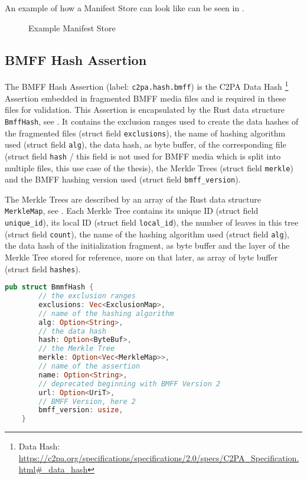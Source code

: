 An example of how a Manifest Store can look like can be seen in .

\begin{figure}[H]
    \caption{Example Manifest Store}
    \label{fig:manifest_store}
\end{figure}

\subsection{BMFF Hash Assertion\label{sec:bmff_assertion}}

The BMFF Hash Assertion (label: \texttt{c2pa.hash.bmff}) is the C2PA Data Hash \footnote{Data Hash: \url{https://c2pa.org/specifications/specifications/2.0/specs/C2PA_Specification.html\#_data_hash}} Assertion embedded in fragmented BMFF media files and is required in these files for validation. This Assertion is encapsulated by the Rust data structure \texttt{BmffHash}, see . It contains the exclusion ranges used to create the data hashes of the fragmented files (struct field \texttt{exclusions}), the name of hashing algorithm used (struct field \texttt{alg}), the data hash, as byte buffer, of the corresponding file (struct field \texttt{hash} / this field is not used for BMFF media which is split into multiple files, this use case of the thesis), the Merkle Trees (struct field \texttt{merkle}) and the BMFF hashing version used (struct field \texttt{bmff\_version}).

The Merkle Trees are described by an array of the Rust data structure \texttt{MerkleMap}, see . Each Merkle Tree contains its unique ID (struct field \texttt{unique\_id}), its local ID (struct field \texttt{local\_id}), the number of leaves in this tree (struct field \texttt{count}), the name of the hashing algorithm used (struct field \texttt{alg}), the data hash of the initialization fragment, as byte buffer and the layer of the Merkle Tree stored for reference, more on that later, as array of byte buffer (struct field \texttt{hashes}).

\begin{minipage}{0.95\linewidth}
\begin{lstlisting}[caption={BmffHash Rust Definition}, label=code:bmff_hash, language=Rust, captionpos=b]
    pub struct BmmfHash {
        // the exclusion ranges
        exclusions: Vec<ExclusionMap>,
        // name of the hashing algorithm
        alg: Option<String>,
        // the data hash
        hash: Option<ByteBuf>,
        // the Merkle Tree
        merkle: Option<Vec<MerkleMap>>,
        // name of the assertion
        name: Option<String>,
        // deprecated beginning with BMFF Version 2
        url: Option<UriT>,
        // BMFF Version, here 2
        bmff_version: usize,
    }
\end{lstlisting}
\end{minipage}

